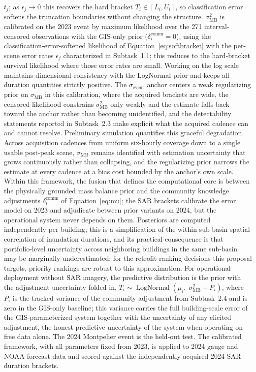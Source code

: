 \documentclass[11pt]{article}
\begin{document}
$t_j$; as $\epsilon_j \to 0$ this recovers the hard bracket $T_i \in [L_i, U_i]$, so classification error softens the truncation
boundaries without changing the structure.
$\sigma_{\mathrm{MB}}^2$ is calibrated on the 2023 event by maximum likelihood
over the 271 interval-censored observations with the GIS-only prior
($\delta_i^{\mathrm{comm}} = 0$), using the classification-error-softened
likelihood of Equation~\eqref{eq:softbracket} with the per-scene error rates
$\epsilon_j$ characterized in Subtask~1.1; this reduces to the hard-bracket
survival likelihood where those error rates are small. Working on the log scale
maintains dimensional consistency with the LogNormal prior and keeps all duration
quantities strictly positive.
The $\sigma_{\mathrm{event}}$ anchor centers a weak regularizing prior on
$\sigma_{\mathrm{MB}}$ in this calibration, where the acquired brackets are wide,
the censored likelihood constrains $\sigma_{\mathrm{MB}}^2$ only weakly and the
estimate falls back toward the anchor rather than becoming unidentified, and the
detectability statements reported in Subtask~2.3 make explicit what the acquired
cadence can and cannot resolve.
Preliminary simulation quantifies this graceful degradation. Across acquisition cadences from uniform
six-hourly coverage down to a single usable post-peak scene,
$\sigma_{\mathrm{MB}}$ remains identified with estimation uncertainty that grows
continuously rather than collapsing, and the regularizing prior narrows the
estimate at every cadence at a bias cost bounded by the anchor's own scale.
Within this framework, the fusion that defines the computational core is between the
physically grounded mass balance prior and the community knowledge adjustments
$\delta_i^{\mathrm{comm}}$ of Equation~\eqref{eq:mu}; the SAR brackets calibrate the error
model on 2023 and adjudicate between prior variants on 2024, but the operational
system never depends on them.
Posteriors are computed independently per building; this is a simplification of
the within-sub-basin spatial correlation of inundation durations, and its practical
consequence is that portfolio-level uncertainty across neighboring buildings in the
same sub-basin may be marginally underestimated; for the retrofit ranking decisions
this proposal targets, priority rankings are robust to this approximation.
For operational deployment without SAR imagery, the predictive distribution is
the prior with the adjustment uncertainty folded in, $T_i \sim
\operatorname{LogNormal}(\mu_i,\; \sigma_{\mathrm{MB}}^2 + P_i)$, where $P_i$ is
the tracked variance of the community adjustment from Subtask~2.4 and is zero in
the GIS-only baseline; this variance carries the full building-scale error of
the GIS-parameterized system together with the uncertainty of any elicited
adjustment, the honest predictive uncertainty of the system when operating on
free data alone.
The 2024 Montpelier event is the held-out test. The calibrated framework, with
all parameters fixed from 2023, is applied to 2024 gauge and NOAA forecast data
and scored against the independently acquired 2024 SAR duration brackets.
\end{document}
